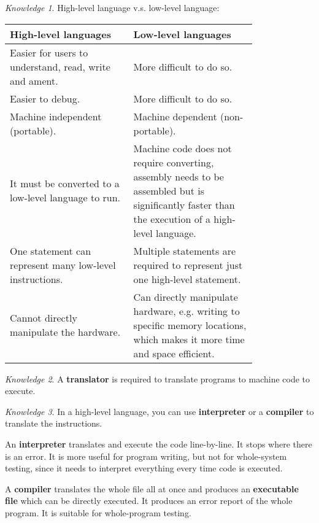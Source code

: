 \documentclass[8pt]{article}
\theoremstyle{remark}
\newtheorem{knowledge}{Knowledge}[subsection]
\begin{document}
            \begin{knowledge}
                High-level language v.s. low-level language:
                \begin{center}
                    \begin{tabular}{p{0.4\linewidth}|p{0.4\linewidth}}
                        High-level languages & Low-level languages\\\hline\hline
                        Easier for users to understand, read, write and ament. & More difficult to do so.\\\hline
                        Easier to debug. & More difficult to do so.\\\hline
                        Machine independent (portable). & Machine dependent (non-portable).\\\hline
                        It must be converted to a low-level language to run. & Machine code does not require converting, assembly needs to be assembled but is significantly faster than the execution of a high-level language.\\\hline
                        One statement can represent many low-level instructions. & Multiple statements are required to represent just one high-level statement.\\\hline
                        Cannot directly manipulate the hardware. & Can directly manipulate hardware, e.g. writing to specific memory locations, which makes it more time and space efficient.
                    \end{tabular}
                \end{center}
            \end{knowledge}

            \begin{knowledge}
                A \textbf{translator} is required to translate programs to machine code to execute.
            \end{knowledge}

            \begin{knowledge}
                In a high-level language, you can use \textbf{interpreter} or a \textbf{compiler} to translate the instructions.

                An \textbf{interpreter} translates and execute the code line-by-line. It stops where there is an error. It is more useful for program writing, but not for whole-system testing, since it needs to interpret everything every time code is executed.

                A \textbf{compiler} translates the whole file all at once and produces an \textbf{executable file} which can be directly executed. It produces an error report of the whole program. It is suitable for whole-program testing.
            \end{knowledge}
\end{document}
